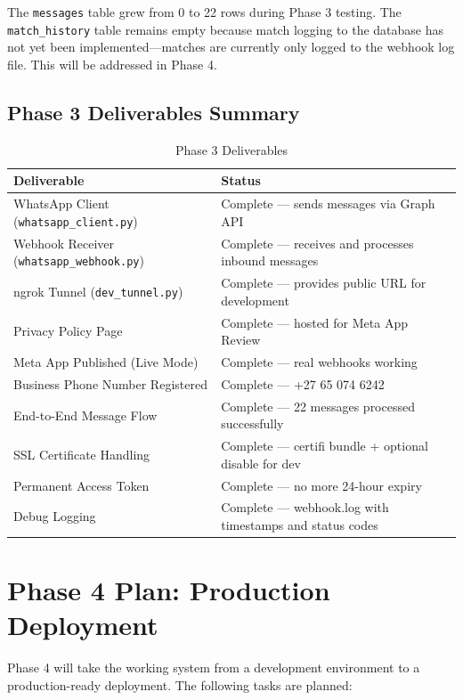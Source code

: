 \documentclass[12pt, a4paper]{report}
\begin{document}
The \texttt{messages} table grew from 0 to 22 rows during Phase 3 testing. The \texttt{match\_history} table remains empty because match logging to the database has not yet been implemented---matches are currently only logged to the webhook log file. This will be addressed in Phase 4.

\section{Phase 3 Deliverables Summary}

\begin{table}[H]
\centering
\begin{tabular}{p{5cm}p{8cm}}
\toprule
\textbf{Deliverable} & \textbf{Status} \\
\midrule
WhatsApp Client (\texttt{whatsapp\_client.py}) & Complete --- sends messages via Graph API \\
Webhook Receiver (\texttt{whatsapp\_webhook.py}) & Complete --- receives and processes inbound messages \\
ngrok Tunnel (\texttt{dev\_tunnel.py}) & Complete --- provides public URL for development \\
Privacy Policy Page & Complete --- hosted for Meta App Review \\
Meta App Published (Live Mode) & Complete --- real webhooks working \\
Business Phone Number Registered & Complete --- +27 65 074 6242 \\
End-to-End Message Flow & Complete --- 22 messages processed successfully \\
SSL Certificate Handling & Complete --- certifi bundle + optional disable for dev \\
Permanent Access Token & Complete --- no more 24-hour expiry \\
Debug Logging & Complete --- webhook.log with timestamps and status codes \\
\bottomrule
\end{tabular}
\caption{Phase 3 Deliverables}
\end{table}

\chapter{Phase 4 Plan: Production Deployment}

Phase 4 will take the working system from a development environment to a production-ready deployment. The following tasks are planned:
\end{document}
